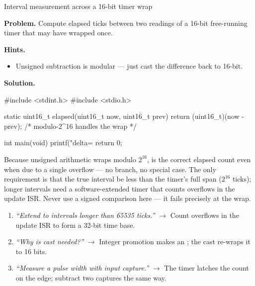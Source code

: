 \begin{gymproblem}{Interval measurement across a 16-bit timer wrap}

\textbf{Problem.} Compute elapsed ticks between two readings of a 16-bit
free-running timer that may have wrapped once.

\textbf{Hints.}
\begin{itemize}
\item Unsigned subtraction is modular --- just cast the difference back to
  16-bit.
\end{itemize}

\attempt

\textbf{Solution.}
\begin{cgym}
#include <stdint.h>
#include <stdio.h>

static uint16_t elapsed(uint16_t now, uint16_t prev) {
    return (uint16_t)(now - prev);    /* modulo-2^16 handles the wrap */
}

int main(void) {
    printf("delta=%
    return 0;
}
\end{cgym}

Because unsigned arithmetic wraps modulo $2^{16}$,  is the
correct elapsed count even when  due to a single overflow ---
no branch, no special case. The only requirement is that the true interval be
less than the timer's full span ($2^{16}$ ticks); longer intervals need a
software-extended timer that counts overflows in the update ISR. Never use a
signed comparison here --- it fails precisely at the wrap.

\followups
\begin{enumerate}
\item \emph{``Extend to intervals longer than 65535 ticks.''} $\rightarrow$
  Count overflows in the update ISR to form a 32-bit time base.
\item \emph{``Why is  cast needed?''} $\rightarrow$ Integer
  promotion makes  an ; the cast re-wraps it to 16
  bits.
\item \emph{``Measure a pulse width with input capture.''} $\rightarrow$ The
  timer latches the count on the edge; subtract two captures the same way.
\end{enumerate}
\end{gymproblem}

